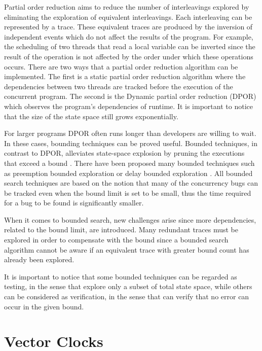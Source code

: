 Partial order reduction aims to reduce the number of interleavings explored by eliminating the 
exploration of equivalent interleavings. Each interleaving can be represented by a trace.
These equivalent traces are produced by the inversion of independent events which do not affect the results of the program. For example, the scheduling of two threads that read a local
variable can be inverted since the result of the operation is not affected by the order under which these operations occurs. 
There are two ways that a partial order reduction algorithm can be implemented. The first is a
static partial order reduction algorithm \cite{Static1997} where the dependencies between two threads are tracked before the execution of the concurrent program. 
The second is the Dynamic partial order reduction (DPOR) \cite{FlanaganDPOR} which observes the program's dependencies of runtime. It is important to notice that the size of
the state space still grows exponentially. 

For larger programs DPOR often runs longer than developers are willing to wait. In these cases, bounding techniques can be proved useful. Bounded techniques,
in contrast to DPOR, alleviates state-space explosion by pruning the executions that exceed a bound \cite{Thomson}. There have been proposed many bounded techniques
such as preemption bounded exploration \cite{BPOR} or delay bounded exploration \cite{Delay11}. All bounded search techniques are based on the notion that many of the concurrency bugs can be
tracked even when the bound limit is set to be small, thus the time required for a bug to be found is significantly smaller.

When it comes to bounded search, new challenges arise \cite{BPOR} since more dependencies, related to the bound limit, are introduced. 
Many redundant traces must be explored in order to compensate with the bound since a bounded search algorithm cannot be aware if an equivalent trace with greater bound count
has already been explored.

It is important to notice that some bounded techniques can be regarded as testing, in the sense that explore only a subset of total state space, while
others can be considered as verification, in the sense that can verify that no error can occur in the given bound.

\section{Vector Clocks}


